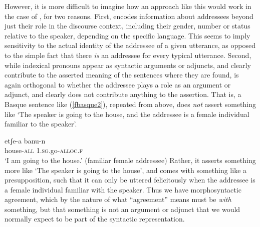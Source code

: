 \documentclass[output=paper, modfonts, nonflat]{langsci/langscibook}
\begin{document}
However, it is more difficult to imagine how an approach like this
would work in the case of \allagr, for two reasons. First, \allagr{}
encodes information about addressees beyond just their role in the
discourse context, including their gender, number or status relative
to the speaker, depending on the specific language. This seems to
imply sensitivity to the actual identity of the addressee of a given
utterance, as opposed to the simple fact that there \emph{is} an
addressee for every typical utterance. Second, while indexical
pronouns appear as syntactic arguments or adjuncts, and clearly
contribute to the asserted meaning of the sentences where they are
found, \allagr{} is again orthogonal to whether the addressee plays a
role as an argument or adjunct, and clearly does not contribute
anything to the assertion. That is, a Basque sentence like
(\ref{fbasque2}), repeated from above, does \emph{not} assert
something like `The speaker is going to the house, and the addressee
is a female individual familiar to the speaker'.

\ea\label{fbasque2}\gll etʃe-a banu-n\\
  house-\textsc{all}{} 1.\textsc{sg}.go-\textsc{alloc}.\textsc{f}\\
  \glt `I am going to the house.' (familiar female addressee)
\z
%
Rather, it asserts something more like `The speaker is going to the
house', and comes with something like a presupposition, such that it
can only be uttered felicitously when the addressee is a female
individual familiar with the speaker. Thus we have morphosyntactic
agreement, which by the nature of what ``agreement'' means must be
\emph{with} something, but that something is not an argument or
adjunct that we would normally expect to be part of the syntactic
representation.
\end{document}
